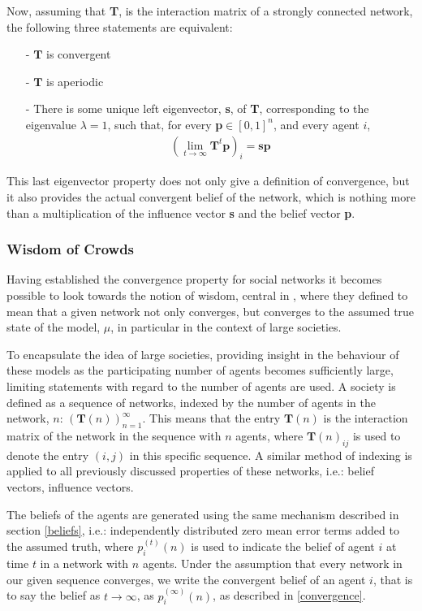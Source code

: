 \documentclass{article}
\newcommand{\T}{\textbf{T}}
\newcommand{\Soc}{(\T(n))^{\infty}_{n=1}}
\newcommand{\beli}[3][2]{p_{#2}^{(#3)}}
\begin{document}
Now, assuming that \T, is the interaction matrix of a strongly connected network, the following three statements are equivalent:
\begin{itemize}
    \item[-] $\T$ is convergent
    \item[-] $\T$ is aperiodic
    \item[-] There is some unique left eigenvector, \textbf{s}, of \T, corresponding to the eigenvalue $\lambda=1$, such that, for every \textbf{p}$\in [0,1]^n$, and every agent $i$,
    \begin{align*}
        (\lim_{t\to\infty}\T^t\textbf{p})_i = \textbf{sp}
    \end{align*}
\end{itemize}

 This last eigenvector property does not only give a definition of convergence, but it also provides the actual convergent belief of the network, which is nothing more than a multiplication of the influence vector \textbf{s} and the belief vector \textbf{p}.

\newpage

\subsubsection{Wisdom of Crowds}

Having established the convergence property for social networks it becomes possible to look towards the notion of wisdom, central in \cite{golub2010naive}, where they defined to mean that a given network not only converges, but converges to the assumed true state of the model, $\mu$, in particular in the context of large societies.

To encapsulate the idea of large societies, providing insight in the behaviour of these models as the participating number of agents becomes sufficiently large, limiting statements with regard to the number of agents are used. A society is defined as a sequence of networks, indexed by the number of agents in the network, $n$: $\Soc$. This means that the entry $\textbf{T}(n)$ is the interaction matrix of the network in the sequence with $n$ agents, where $\textbf{T}(n)_{ij}$ is used to denote the entry $(i,j)$ in this specific sequence. A similar method of indexing is applied to all previously discussed properties of these networks, i.e.: belief vectors, influence vectors.

The beliefs of the agents are generated using the same mechanism described in section \ref{beliefs}, i.e.: independently distributed zero mean error terms added to the assumed truth, where $\beli{i}{t}(n)$ is used to indicate the belief of agent $i$ at time $t$ in a network with $n$ agents. Under the assumption that every network in our given sequence converges, we write the convergent belief of an agent $i$, that is to say the belief as $t \to\infty$, as $\beli{i}{\infty}(n)$, as described in \ref{convergence}.
\end{document}

